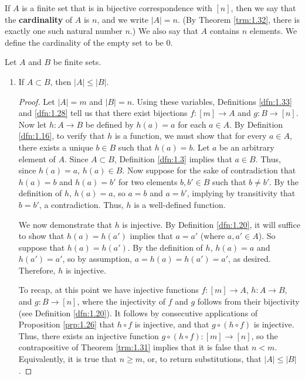 \documentclass[../main.tex]{subfiles}
\begin{document}
\begin{definition}\label{dfn:1.33}
    If $A$ is a finite set that is in bijective correspondence with $[n]$, then we say that the \textbf{cardinality} of $A$ is $n$, and we write $|A|=n$. (By Theorem \ref{trm:1.32}, there is exactly one such natural number $n$.) We also say that $A$ contains $n$ elements. We define the cardinality of the empty set to be 0.
\end{definition}

\begin{exercise}\label{trm:1.34}
    Let $A$ and $B$ be finite sets.
    \begin{enumerate}[label={\alph*)}]
        \item If $A\subset B$, then $|A|\leq|B|$.
        \begin{proof}
            Let $|A|=m$ and $|B|=n$. Using these variables, Definitions \ref{dfn:1.33} and \ref{dfn:1.28} tell us that there exist bijections $f:[m]\to A$ and $g:B\to[n]$. Now let $h:A\to B$ be defined by $h(a)=a$ for each $a\in A$. By Definition \ref{dfn:1.16}, to verify that $h$ is a function, we must show that for every $a\in A$, there exists a unique $b\in B$ such that $h(a)=b$. Let $a$ be an arbitrary element of $A$. Since $A\subset B$, Definition \ref{dfn:1.3} implies that $a\in B$. Thus, since $h(a)=a$, $h(a)\in B$. Now suppose for the sake of contradiction that $h(a)=b$ and $h(a)=b'$ for two elements $b,b'\in B$ such that $b\neq b'$. By the definition of $h$, $h(a)=a$, so $a=b$ and $a=b'$, implying by transitivity that $b=b'$, a contradiction. Thus, $h$ is a well-defined function.\par
            We now demonstrate that $h$ is injective. By Definition \ref{dfn:1.20}, it will suffice to show that $h(a)=h(a')$ implies that $a=a'$ (where $a,a'\in A$). So suppose that $h(a)=h(a')$. By the definition of $h$, $h(a)=a$ and $h(a')=a'$, so by assumption, $a=h(a)=h(a')=a'$, as desired. Therefore, $h$ is injective.\par
            To recap, at this point we have injective functions $f:[m]\to A$, $h:A\to B$, and $g:B\to [n]$, where the injectivity of $f$ and $g$ follows from their bijectivity (see Definition \ref{dfn:1.20}). It follows by consecutive applications of Proposition \ref{prp:1.26} that $h\circ f$ is injective, and that $g\circ (h\circ f)$ is injective. Thus, there exists an injective function $g\circ (h\circ f):[m]\to[n]$, so the contrapositive of Theorem \ref{trm:1.31} implies that it is false that $n<m$. Equivalently, it is true that $n\geq m$, or, to return substitutions, that $|A|\leq|B|$.

\end{proof}
\end{enumerate}
\end{exercise}
\end{document}
